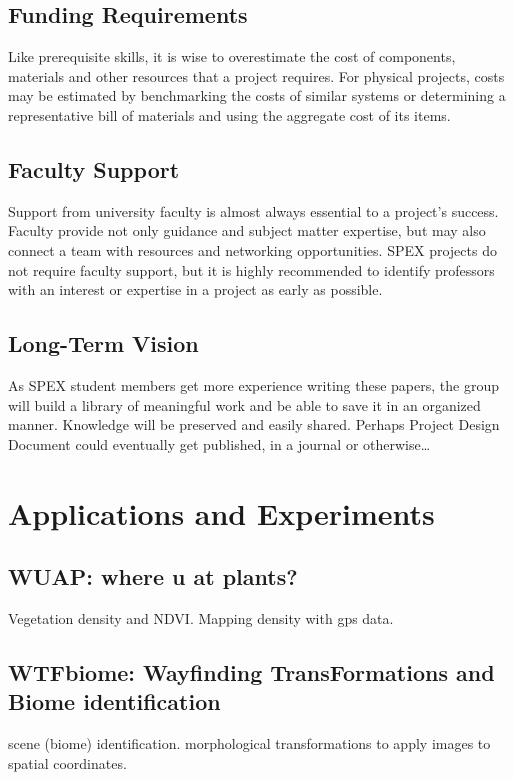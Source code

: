 \documentclass[conference]{IEEEtran} %
\begin{document}
\subsection{Funding Requirements}
Like prerequisite skills, it is wise to overestimate the cost of components, materials and other resources that a project requires.
For physical projects, costs may be estimated by benchmarking the costs of similar systems or determining a representative bill of materials and using the aggregate cost of its items.

\subsection{Faculty Support}
Support from university faculty is almost always essential to a project's success.
Faculty provide not only guidance and subject matter expertise, but may also connect a team with resources and networking opportunities.
SPEX projects do not require faculty support, but it is highly recommended to identify professors with an interest or expertise in a project as early as possible.

\subsection{Long-Term Vision}
\label{sec:vision}
As SPEX student members get more experience writing these papers, the group will build a library of meaningful work and be able to save it in an organized manner.
Knowledge will be preserved and easily shared.
Perhaps Project Design Document could eventually get published, in a journal or otherwise\ldots

\section{Applications and Experiments}
\label{sec:payloads}
\subsection{WUAP: where u at plants?}
Vegetation density and NDVI. Mapping density with gps data.

\subsection{WTFbiome: Wayfinding TransFormations and Biome identification}
scene (biome) identification.
morphological transformations to apply images to spatial coordinates.
\end{document}
